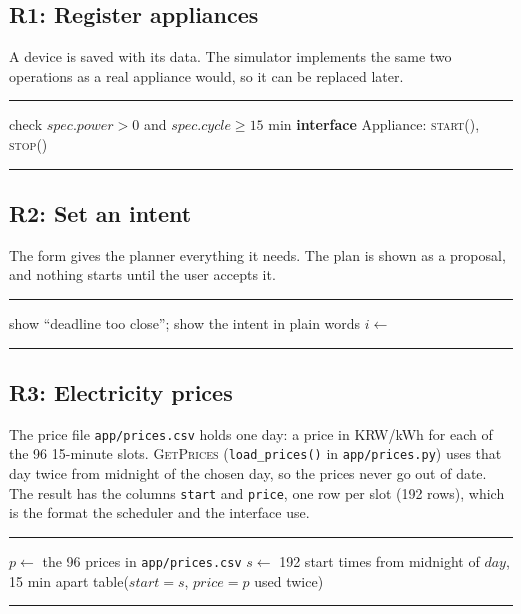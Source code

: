 \documentclass[conference,a4paper]{IEEEtran}
\newenvironment{pseudo}
  {\par\vspace{2pt}\noindent\begin{minipage}{\columnwidth}\hrule\vspace{2pt}\footnotesize\begin{algorithmic}[1]}
  {\end{algorithmic}\vspace{1pt}\hrule\end{minipage}\par\vspace{3pt}}
\begin{document}
\subsection{R1: Register appliances}
A device is saved with its data. The simulator implements the same two operations as a real appliance would, so it can be replaced later.
\begin{pseudo}
\State check $spec.power > 0$ and $spec.cycle \ge 15$ min
\State \Return {}
\EndProcedure
\Statex
\State \textbf{interface} Appliance: \textsc{start}(), \textsc{stop}() 
\end{pseudo}

\subsection{R2: Set an intent}
The form gives the planner everything it needs. The plan is shown as a proposal, and nothing starts until the user accepts it.
\begin{pseudo}
  \State show ``deadline too close''; \Return
\EndIf
\State show the intent in plain words
\State $i \gets$ 
\State \Return {} 
\EndProcedure
\end{pseudo}

\subsection{R3: Electricity prices}
The price file \texttt{app/prices.csv} holds one day: a price in KRW/kWh for each of the 96 15-minute slots. \textsc{GetPrices} (\texttt{load\_prices()} in \texttt{app/prices.py}) uses that day twice from midnight of the chosen day, so the prices never go out of date. The result has the columns \texttt{start} and \texttt{price}, one row per slot (192 rows), which is the format the scheduler and the interface use.
\begin{pseudo}
 
\State $p \gets$ the 96 prices in \texttt{app/prices.csv}
\State $s \gets$ 192 start times from midnight of $day$, 15 min apart
\State \Return table($start = s$, $price = p$ used twice)
\EndProcedure
\end{pseudo}
\end{document}
